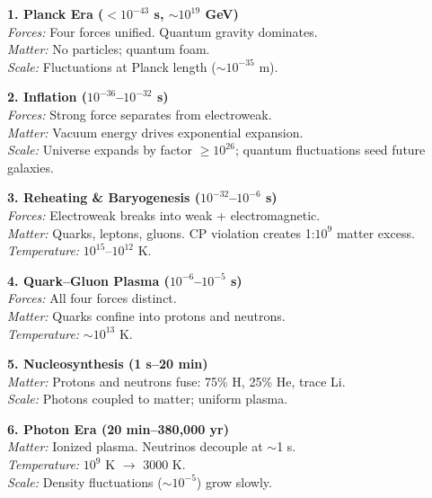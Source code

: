 \newpage
\begin{center}

\begin{tcolorbox}[
  colback=blue!3,
  colframe=blue!45,
  coltitle=white,
  fonttitle=\bfseries\large,
  title={$\Lambda$CDM Cosmology Timeline},
  sharp corners,
  boxrule=1pt,
  left=3pt,
  right=3pt,
  top=2pt,
  bottom=2pt,
  before upper={\footnotesize\setlength{\parskip}{2pt}},
  height=23cm,
  width=\textwidth
]

\textbf{1. Planck Era ($<10^{-43}$ s, $\sim10^{19}$ GeV)}\\
\textit{Forces:} Four forces unified. Quantum gravity dominates.\\
\textit{Matter:} No particles; quantum foam.\\
\textit{Scale:} Fluctuations at Planck length ($\sim10^{-35}$ m).

\textbf{2. Inflation ($10^{-36}$–$10^{-32}$ s)}\\
\textit{Forces:} Strong force separates from electroweak.\\
\textit{Matter:} Vacuum energy drives exponential expansion.\\
\textit{Scale:} Universe expands by factor $\geq10^{26}$; quantum fluctuations seed future galaxies.

\textbf{3. Reheating \& Baryogenesis ($10^{-32}$–$10^{-6}$ s)}\\
\textit{Forces:} Electroweak breaks into weak + electromagnetic.\\
\textit{Matter:} Quarks, leptons, gluons. CP violation creates 1:$10^9$ matter excess.\\
\textit{Temperature:} $10^{15}$–$10^{12}$ K.

\textbf{4. Quark–Gluon Plasma ($10^{-6}$–$10^{-5}$ s)}\\
\textit{Forces:} All four forces distinct.\\
\textit{Matter:} Quarks confine into protons and neutrons.\\
\textit{Temperature:} $\sim10^{13}$ K.

\textbf{5. Nucleosynthesis (1 s–20 min)}\\
\textit{Matter:} Protons and neutrons fuse: 75\% H, 25\% He, trace Li.\\
\textit{Scale:} Photons coupled to matter; uniform plasma.

\textbf{6. Photon Era (20 min–380,000 yr)}\\
\textit{Matter:} Ionized plasma. Neutrinos decouple at $\sim$1 s.\\
\textit{Temperature:} $10^9$ K $\rightarrow$ 3000 K.\\
\textit{Scale:} Density fluctuations ($\sim10^{-5}$) grow slowly.


\end{tcolorbox}
\end{center}
